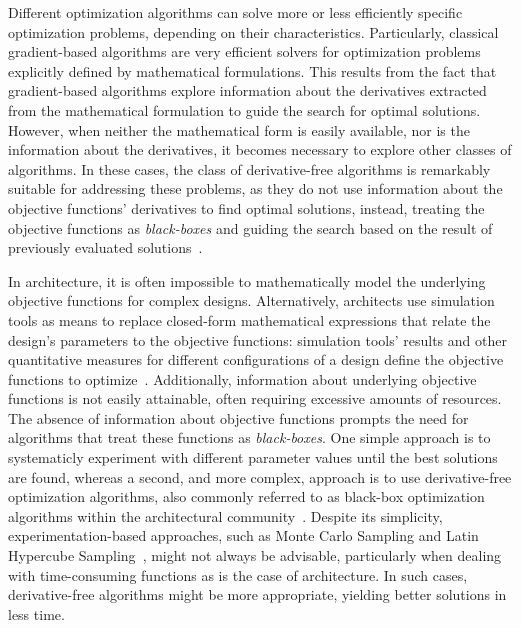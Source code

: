 	Different optimization algorithms can solve more or less efficiently specific optimization problems, depending on their characteristics. Particularly, classical gradient-based algorithms are very efficient solvers for optimization problems explicitly defined by mathematical formulations. This results from the fact that gradient-based algorithms explore information about the derivatives extracted from the mathematical formulation to guide the search for optimal solutions. However, when neither the mathematical form is easily available, nor is the information about the derivatives, it becomes necessary to explore other classes of algorithms. In these cases, the class of derivative-free algorithms is remarkably suitable for addressing these problems, as they do not use information about the objective functions' derivatives to find optimal solutions, instead, treating the objective functions as \textit{black-boxes} and guiding the search based on the result of previously evaluated solutions~\cite{Rios2013}.
	
	In architecture, it is often impossible to mathematically model the underlying objective functions for complex designs. Alternatively, architects use simulation tools as means to replace closed-form mathematical expressions that relate the design's parameters to the objective functions: simulation tools' results and other quantitative measures for different configurations of a design define the objective functions to optimize~\cite{Wortmann2016BBO}. Additionally, information about underlying objective functions is not easily attainable, often requiring excessive amounts of resources. The absence of information about objective functions prompts the need for algorithms that treat these functions as \textit{black-boxes}. One simple approach is to systematicly experiment with different parameter values until the best solutions are found, whereas a second, and more complex, approach is to use derivative-free optimization algorithms, also commonly referred to as black-box optimization algorithms within the architectural community~\cite{Wortmann2016BBO}. Despite its simplicity, experimentation-based approaches, such as Monte Carlo Sampling and Latin Hypercube Sampling~\cite{Giunta2003DOE}, might not always be advisable, particularly when dealing with time-consuming functions as is the case of architecture. In such cases, derivative-free algorithms might be more appropriate, yielding better solutions in less time.

